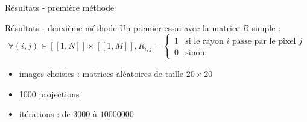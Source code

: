 \documentclass{beamer}
\newcommand*{\iintervalle}[2]{[\![#1,#2]\!]}
\begin{document}
\begin{frame}{Résultats - première méthode}
	\begin{figure}
        \centering
    \end{figure}
\end{frame}

\begin{frame}{Résultats - deuxième méthode}
    Un premier essai avec la matrice $R$ simple : 
    $$\forall (i,j) \in \iintervalle{1}{N} \times \iintervalle{1}{M},R_{i,j} = \left\{
        \begin{array}{ll}
            1 & \mbox{si le rayon } i \mbox{ passe par le pixel } j  \\
            0 & \mbox{sinon.}
        \end{array}
    \right.$$ 
    \pause
    \begin{itemize}
        \item images choisies : matrices aléatoires de taille $20 \times 20$
        \item 1000 projections
        \item itérations : de $3 000$ à $10 000 000$
    \end{itemize}
\end{frame}
\end{document}
